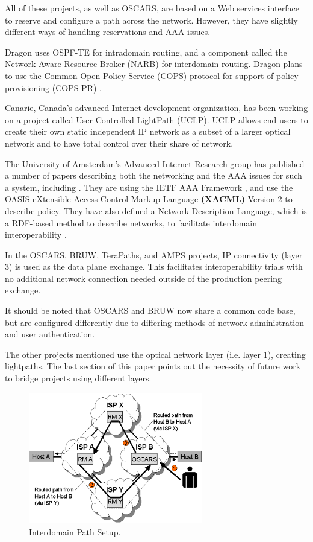 \documentclass[conference]{IEEEtran}
\begin{document}
All of these projects, as well as OSCARS, are based on a Web services 
interface to reserve and configure a path across the network. However, they 
have slightly different ways of handling reservations and AAA issues.

Dragon uses OSPF-TE \cite{ospf-te} for intradomain routing, and a component called
the Network Aware Resource Broker (NARB) for interdomain routing.
Dragon plans to use the Common Open Policy Service (COPS) \cite{COPS}
protocol for support of policy provisioning (COPS-PR) \cite{COPS-PR}.

Canarie, Canada's advanced Internet development organization, has been
working on a project called User Controlled LightPath (UCLP).  UCLP
allows end-users to create their own static independent IP network as a subset
of a larger optical network and to have total control over their share
of network.

The University of Amsterdam's Advanced Internet Research group has
published a number of papers
describing both the networking and the AAA issues for such a system,
including \cite{gommans05} \cite{gommans06} \cite{demchenko} . 
They are using the IETF AAA Framework
\cite{AAA}, and use the 
OASIS eXtensible Access Control Markup Language \textbf{(XACML)} Version 2
to describe policy. They have also defined a
Network Description Language, which is a RDF-based method to
describe networks, to facilitate interdomain interoperability \cite{ndl}.

In the OSCARS, BRUW, TeraPaths, and AMPS projects, IP connectivity (layer
3) is used as the data plane exchange.  This facilitates interoperability
trials with no additional network connection needed outside of the production
peering exchange.

It should be noted that OSCARS and BRUW now share a common code base, but
are configured differently due to differing methods of network administration
and user authentication.

The other projects mentioned use the optical network layer (i.e. layer 1), 
creating lightpaths.  The last section of this paper points out the
necessity of future work to bridge projects using different layers.

\begin{figure}
 \centering 
   \includegraphics[width=3in]{pict2.eps}
   \caption{Interdomain Path Setup.}
 \label{fig:interdomain_path_setup}
\end{figure}
\end{document}
